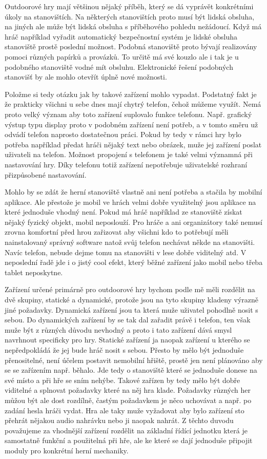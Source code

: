 Outdoorové hry mají většinou nějaký příběh, který se dá vyprávět konkrétními úkoly na stanovištích.
Na některých stanovištích proto musí být lidská obsluha, na jiných ale může být lidská obsluha s příběhového pohledu nežádoucí.
Když má hráč například vyřadit automatický bezpečnostní systém je lidské obsluha stanoviště prostě poslední možnost.
Podobná stanoviště proto bývají realizovány pomoci různých papírků a provázků.
To určitě má své kouzlo ale i tak je u podobného stanoviště vodné mít obsluhu.
Elektronické řešení podobných stanovišť by ale mohlo otevřít úplně nové možnosti.

Položme si tedy otázku jak by takové zařízení mohlo vypadat.
Podstatný fakt je že prakticky všichni u sebe dnes mají chytrý telefon, čehož můžeme využít.
Nemá proto velký význam aby toto zařízení suplovalo funkce telefonu.
Např. grafický výstup typu display proto v podobném zařízení není potřeb, a v tomto směru už odvádí telefon naprosto dostatečnou práci.
Pokud by tedy v rámci hry bylo potřeba například předat hráči nějaký text nebo obrázek, muže jej zařízení poslat uživateli na telefon.
Možnost propojení s telefonem je také velmi významná při nastavování hry.
Díky telefonu totiž zařízení nepotřebuje uživatelské rozhraní přizpůsobené nastavování.

Mohlo by se zdát že herní stanoviště vlastně ani není potřeba a stačila by mobilní aplikace.
Ale přestože je mobil ve hrách velmi dobře využitelný jsou aplikace na které jednoduše vhodný není.
Pokud má hráč například ze stanoviště získat nějaký fyzický objekt, mobil neposlouží.
Pro hráče a ani organizátory také nemusí zrovna komfortní před hrou zařizovat aby všichni kdo to potřebují měli nainstalovaný správný software natož svůj telefon nechávat někde na stanovišti.
Navíc telefon, nebude dejme tomu na stanovišti v lese dobře viditelný atd.
V neposlední řadě jde i o jistý cool efekt, který běžné zařízení jako mobil nebo třeba tablet neposkytne.

Zařízení určené primárně pro outdoorové hry bychom podle mě měli rozdělit na dvě skupiny, statické a dynamické, protože jsou na tyto skupiny kladeny výrazně jiné požadavky.
Dynamická zařízení jsou ta která muže uživatel pohodlně nosit s sebou.
Do dynamických zařízení by se tak dal zařadit právě i telefon, ten však muže být z různých důvodu nevhodný a proto i tato zařízení dává smysl navrhnout specificky pro hry.
Statické zařízení ja naopak zařízení u kterého se nepředpokládá že jej bude hráč nosit s sebou.
Přesto by mělo být jednoduše přenositelné, není účelem postavit nemobilní hřiště, prostě jen není plánováno aby se se zařízením např. běhalo.
Jde tedy o stanoviště které se jednoduše donese na své místo a při hře se sním nehýbe.
Takové zařízen by tedy mělo být dobře viditelné a splnovat požadavky které na něj hra klade.
Požadavky různých her můžou být ale dost rozdílně, častým požadavkem je něco uchovávat a např. po zadání hesla hráči vydat.
Hra ale taky muže vyžadovat aby bylo zařízení sto přehrát nějakou audio nahrávku nebo ji naopak nahrát.
Z těchto duvodu považujeme za vhodnější zařízení rozdělit na základní řídící jednotku která je samostatně funkční a použitelná při hře, ale ke které se dají jednoduše připojit moduly pro konkrétní herní mechaniky.

